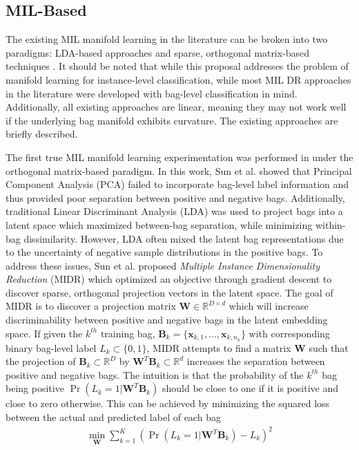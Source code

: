 \subsection{MIL-Based}
The existing MIL manifold learning in the literature can be broken into two paradigms: LDA-based approaches and sparse, orthogonal matrix-based techniques \citep{Zhu2018MIDRSparsity}.  It should be noted that while this proposal addresses the problem of manifold learning for instance-level classification, while most MIL DR approaches in the literature were developed with bag-level classification in mind.  Additionally, all existing approaches are linear, meaning they may not work well if the underlying bag manifold exhibits curvature.  The existing approaches are briefly described. 

The first true MIL manifold learning experimentation was performed in \citep{Sun2010MIDR} under the orthogonal matrix-based paradigm.  In this work, Sun et al. showed that Principal Component Analysis (PCA) failed to incorporate bag-level label information and thus provided poor separation between positive and negative bags.  Additionally, traditional Linear Discriminant Analysis (LDA) was used to project bags into a latent space which maximized between-bag separation, while minimizing within-bag dissimilarity.  However, LDA often mixed the latent bag representations due to the uncertainty of negative sample distributions in the positive bags.  To address these issues, Sun et al. proposed \textit{Multiple Instance Dimensionality Reduction} (MIDR) which optimized an objective through gradient descent to discover sparse, orthogonal projection vectors in the latent space.  The goal of MIDR is to discover a projection matrix $\bm{W} \in \mathbb{R}^{D \times d}$ which will increase discriminability between positive and negative bags in the latent embedding space.  If given the $k^{th}$ training bag, $\bm{B}_{k} = \{ \bm{x}_{k,1}, \dots, \bm{x}_{k,n_{k}} \}$ with corresponding binary bag-level label $L_k \subset \{0,1\}$, MIDR attempts to find a matrix $\bm{W}$ such that the projection of $\bm{B}_{k} \subset \mathbb{R}^{D}$ by $\bm{W}^{T}\bm{B}_{k} \subset \mathbb{R}^{d}$ increases the separation between positive and negative bags. The intuition is that the probability of the $k^{th}$ bag being positive $\Pr(L_{k}=1|\bm{W}^{T}\bm{B}_{k})$ should be close to one if it is positive and close to zero otherwise.  This can be achieved by minimizing the squared loss between the actual and predicted label of each bag
\begin{align}
	\min_{\bm{W}} \sum_{k=1}^{K} (\Pr(L_{k}=1|\bm{W}^{T}\bm{B}_{k}) - L_{k})^{2}
	\label{eq:MIDR_orig_objective}
\end{align}
